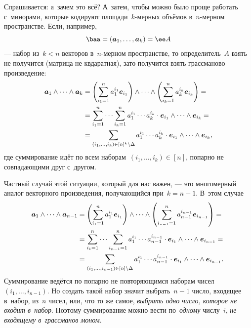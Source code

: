 Спрашивается: а~зачем это всё? А~затем, чтобы можно было проще работать с~минорами, которые кодируют площади~$k$-мерных объёмов в~$n$-мерном пространстве. Если, например, 
\[
	\baa = (\vec{a}_1, \dots, \vec{a}_k) = \ee A
\]
--- набор из~$k < n$ векторов в~$n$-мерном пространстве, то определитель~$A$ взять не получится (матрица не квдаратная), зато получится взять грассманово произведение:
\begin{align*}
	\bm{a}_1 \wedge\cdots\wedge \bm{a}_k
	&=
	\left( 
		\sum_{i_1 = 1}^{n}
			a_1^{i_1}
			\bm{e}_{i_1}
	\right)
	\wedge\cdots\wedge
	\left( 
		\sum_{i_k = 1}^{n}
			a_k^{i_k}
			\bm{e}_{i_k}
	\right)
	= {} \\ {} &=
	\sum_{i_1 = 1}^{n}
	\cdots
	\sum_{i_k = 1}^{n}
		a_1^{i_1}
		\cdots
		a_k^{i_k}
	\cdot
		\bm{e}_{i_1}
		\wedge\cdots\wedge
		\bm{e}_{i_k}
	= {} \\ {} &=
	\sum_{(i_1, \dots, i_k) \in [n]^k \setminus \Delta}
		a_1^{i_1}
		\cdots
		a_k^{i_k}
	\cdot
		\bm{e}_{i_1}
		\wedge\cdots\wedge
		\bm{e}_{i_k}
	,
\end{align*}
где суммирование идёт по всем наборам~$(i_1, \dots, i_k) \in [n]$, попарно не совпадающими друг с~другом.

Частный случай этой ситуации, который для нас важен, --- это многомерный аналог векторного произведения, получающийся при~$k = n-1$. В~этом случае
\begin{align*}
	\bm{a}_1 \wedge\cdots\wedge \bm{a}_{n-1}
	&=
	\left( 
		\sum_{i_1 = 1}^{n}
			a_1^{i_1}
			\bm{e}_{i_1}
	\right)
	\wedge\cdots\wedge
	\left( 
		\sum_{i_{n-1} = 1}^{n}
			a_{n-1}^{i_{n-1}}
			\bm{e}_{i_{n-1}}
	\right)
	= {} \\ {} &=
	\sum_{i_1 = 1}^{n}
	\cdots
	\sum_{i_{n-1} = 1}^{n}
		a_1^{i_1}
		\cdots
		a_{n-1}^{i_{n-1}}
	\cdot
		\bm{e}_{i_1}
		\wedge\cdots\wedge
		\bm{e}_{i_{n-1}}
	= {} \\ {} &=
	\sum_{(i_1, \dots, i_{n-1}) \in [n] \setminus \Delta}
		a_1^{i_1}
		\cdots
		a_{n-1}^{i_{n-1}}
	\cdot
		\bm{e}_{i_1}
		\wedge\cdots\wedge
		\bm{e}_{i_{n-1}}
	.
\end{align*}
Суммирование ведётся по попарно не повторяющимся наборам чисел~$(i_1, \dots, i_{n-1})$. Но создать такой набор значит выбрать~$n-1$ число, входящее в~набор, из~$n$ чисел, или, что то же самое, \emph{выбрать одно число, которое не входит в~набор}. Поэтому суммирование можно вести по~\emph{одному} числу~$i$, \emph{не входящему в~грассманов моном}.
\sloppy

